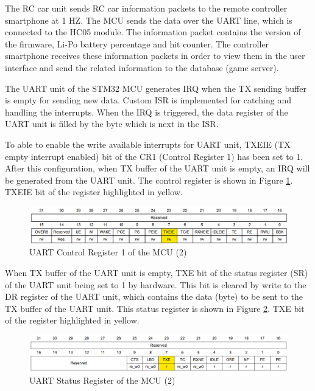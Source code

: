 The RC car unit sends RC car information packets to the remote controller smartphone at 1 HZ. The MCU sends the data over the UART line, which is connected to the HC05 module. The information packet contains the version of the firmware, Li-Po battery percentage and hit counter. The controller smartphone receives these information packets in order to view them in the user interface and send the related information to the database (game server). 

The UART unit of the STM32 MCU generates IRQ when the TX sending buffer is empty for sending new data. Custom ISR is implemented for catching and handling the interrupts. When the IRQ is triggered, the data register of the UART unit is filled by the byte which is next in the ISR.

To able to enable the write available interrupts for UART unit, TXEIE (TX empty interrupt enabled) bit of the CR1 (Control Register 1) has been set to 1. After this configuration, when TX buffer of the UART unit is empty, an IRQ will be generated from the UART unit. The control register is shown in Figure \ref{fig:uart_cr_tx_register}. TXEIE bit of the register highlighted in yellow.

\begin{figure}[!htbp]
    \centering
    \includegraphics[width=1\textwidth]{Imgs/cr_tx_register.png}
    \caption{\label{fig:uart_cr_tx_register}UART Control Register 1 of the MCU (2) \cite{Ref_stm32_um}}
\end{figure}

When TX buffer of the UART unit is empty, TXE bit of the status register (SR) of the UART unit being set to 1 by hardware. This bit is cleared by write to the DR register of the UART unit, which contains the data (byte) to be sent to the TX buffer of the UART unit. This status register is shown in Figure \ref{fig:uart_sr_tx_register}. TXE bit of the register highlighted in yellow.

\begin{figure}[!htbp]
    \centering
    \includegraphics[width=1\textwidth]{Imgs/sr_tx_register.png}
    \caption{\label{fig:uart_sr_tx_register}UART Status Register of the MCU (2) \cite{Ref_stm32_um}}
\end{figure}


